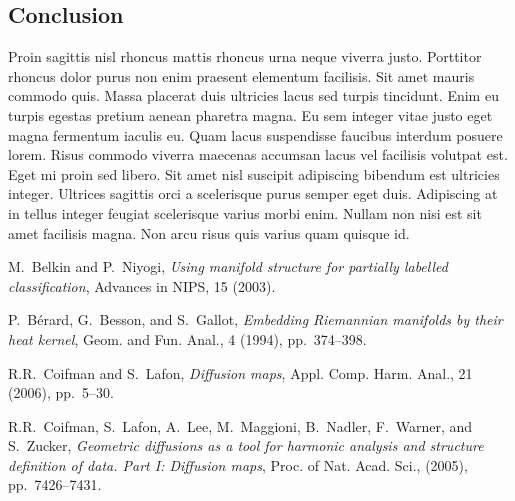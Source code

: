 \documentclass[a4paper,12pt]{article}
\begin{document}
\begin{multicols}{2}
\section{Conclusion}
Proin sagittis nisl rhoncus mattis rhoncus urna neque viverra justo. Porttitor rhoncus dolor purus non enim praesent elementum facilisis. Sit amet mauris commodo quis. Massa placerat duis ultricies lacus sed turpis tincidunt. Enim eu turpis egestas pretium aenean pharetra magna. Eu sem integer vitae justo eget magna fermentum iaculis eu. Quam lacus suspendisse faucibus interdum posuere lorem. Risus commodo viverra maecenas accumsan lacus vel facilisis volutpat est. Eget mi proin sed libero. Sit amet nisl suscipit adipiscing bibendum est ultricies integer. Ultrices sagittis orci a scelerisque purus semper eget duis. Adipiscing at in tellus integer feugiat scelerisque varius morbi enim. Nullam non nisi est sit amet facilisis magna. Non arcu risus quis varius quam quisque id.

\begin{thebibliography}{10}
M.~Belkin and P.~Niyogi, {\em Using manifold structure for partially
  labelled classification}, Advances in NIPS, 15 (2003).

P.~B\'erard, G.~Besson, and S.~Gallot, {\em Embedding {R}iemannian
  manifolds by their heat kernel}, Geom. and Fun. Anal., 4 (1994),
  pp.~374--398.

R.R.~Coifman and S.~Lafon, {\em Diffusion maps}, Appl. Comp. Harm. Anal.,
  21 (2006), pp.~5--30.

R.R.~Coifman, S.~Lafon, A.~Lee, M.~Maggioni, B.~Nadler, F.~Warner, and
  S.~Zucker, {\em Geometric diffusions as a tool for harmonic analysis and
  structure definition of data. {P}art {I}: Diffusion maps}, Proc. of Nat.
  Acad. Sci.,  (2005), pp.~7426--7431.

\end{thebibliography}

\end{multicols}
\end{document}
